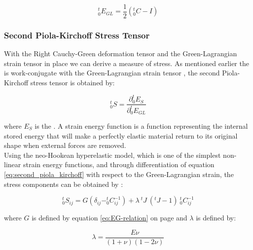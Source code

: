 \begin{equation}
\label{eq:green_lagrange_strain_tensor}
^t_0E_{GL} = \frac{1}{2}( ^t_0C - I)
\end{equation}


\subsubsection*{Second Piola-Kirchoff Stress Tensor}
\label{sec:second_piola_kirchoff_stress_tensor}
With the Right Cauchy-Green deformation tensor and the Green-Lagrangian
strain tensor in place we can derive a measure of stress. 
As mentioned earlier the  is
work-conjugate with the Green-Lagrangian strain tensor
, the second Piola-Kirchoff stress
tensor is obtained by: 

\begin{equation}
\label{eq:second_piola_kirchoff}
^t_0S = \frac{\partial ^t_0E_S}{\partial ^t_0E_{GL}}
\end{equation}

where $E_S$ is the .
A strain energy function is a function representing the internal
stored energy that will make a perfectly elastic material return to
its original shape when external forces are removed. \\

Using the neo-Hookean hyperelastic model, which is one of the simplest
non-linear strain energy functions, and through differentiation of equation 
\eqref{eq:second_piola_kirchoff} with respect to the Green-Lagrangian
strain, the stress components can be obtained by
:

\begin{equation}
\label{eq:second_piola_kirchoff_tensor}
^t_0S_{ij} = G (\delta_{ij} - ^t_0C_{ij}^{-1}) + \lambda \ ^tJ \ (^tJ-1) \ ^t_0C_{ij}^{-1}
\end{equation}

where $G$ is defined by equation \eqref{eq:EG-relation} on page
\pageref{eq:EG-relation} and $\lambda$ is defined by:

\begin{equation}
\lambda = \frac{E\nu}{(1+\nu)(1-2\nu)}
\end{equation}

